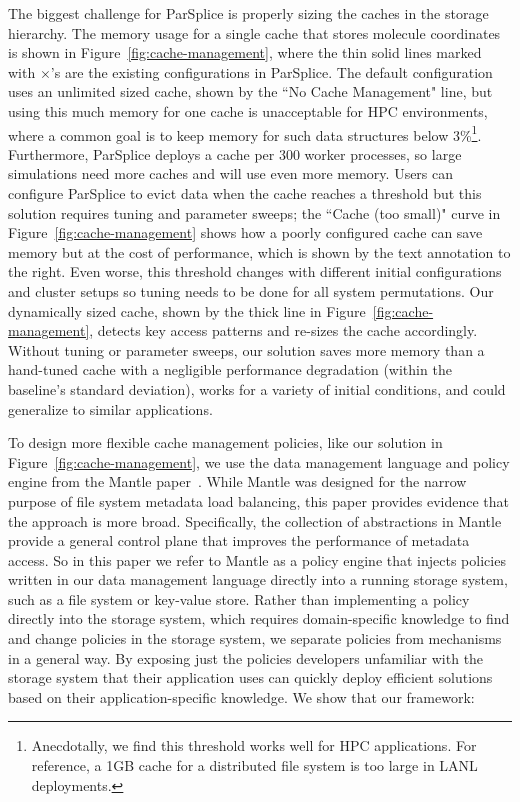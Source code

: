 The biggest challenge for ParSplice is properly sizing the caches in the
storage hierarchy.  The memory usage for a single cache that stores molecule
coordinates is shown in Figure~\ref{fig:cache-management}, where the thin solid
lines marked with \(\times\)'s are the existing configurations in ParSplice.
The default configuration uses an unlimited sized cache, shown by the ``No
Cache Management" line, but using this much memory for one cache is
unacceptable for HPC environments, where a common goal is to keep memory for
such data structures below 3\%\footnote{Anecdotally, we find this threshold
works well for HPC applications.  For reference, a 1GB cache for a distributed
file system is too large in LANL deployments.}. Furthermore, ParSplice deploys
a cache per 300 worker processes, so large simulations need more caches and
will use even more memory.  Users can configure ParSplice to evict data when
the cache reaches a threshold but this solution requires tuning and parameter
sweeps; the ``Cache (too small)" curve in Figure~\ref{fig:cache-management}
shows how a poorly configured cache can save memory but at the cost of
performance, which is shown by the text annotation to the right.  Even worse,
this threshold changes with different initial configurations and cluster setups
so tuning needs to be done for all system permutations.  Our dynamically sized
cache, shown by the thick line in Figure~\ref{fig:cache-management}, detects
key access patterns and re-sizes the cache accordingly.  Without tuning or
parameter sweeps, our solution saves more memory than a hand-tuned cache with a
negligible performance degradation (within the baseline's standard deviation),
works for a variety of initial conditions, and could generalize to similar
applications.

To design more flexible cache management policies, like our solution in
Figure~\ref{fig:cache-management}, we use the data management language and
policy engine from the Mantle paper~\cite{sevilla:sc15-mantle}.  While Mantle
was designed for the narrow purpose of file system metadata load balancing,
this paper provides evidence that the approach is more broad.  Specifically,
the collection of abstractions in Mantle provide a general control plane that
improves the performance of metadata access. So in this paper we refer to
Mantle as a policy engine that injects policies written in our data management
language directly into a running storage system, such as a file system or key-value
store.  Rather than implementing a policy directly into the storage system,
which requires domain-specific knowledge to find and change policies in the
storage system, we separate policies from mechanisms in a general way.  By
exposing just the policies developers unfamiliar with the storage system that
their application uses can quickly deploy efficient solutions based on their
application-specific knowledge.  We show that our framework:

